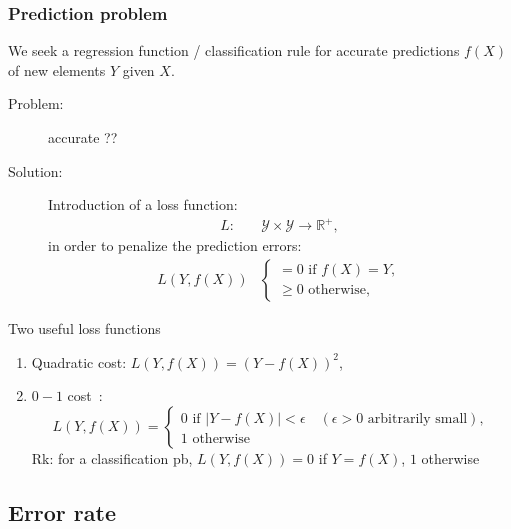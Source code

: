 \documentclass[compress, smaller, serif, 9pt]{beamer}
\begin{document}
\begin{frame}
  \frametitle{Prediction problem}
  We seek a regression function / classification rule for  \alert{accurate} predictions $f(X)$ 
  of new elements $Y$ given $X$.
  \begin{description}
   \item[Problem:] \alert{accurate ??}
   \item[Solution:] Introduction of a loss function:
   \begin{align*}
    L: \quad & \mathcal{Y} \times \mathcal{Y} \rightarrow \mathbb{R}^+,
   \end{align*}
   in order to penalize the prediction errors:
\begin{align*}
    L (Y, f(X) ) &
    \begin{cases}= 0 \textrm{ if } f(X)=Y,\\
     \ge 0 \textrm{ otherwise},
     \end{cases}
   \end{align*}
  \end{description}


  \begin{block}{Two useful loss functions}
  \begin{enumerate}
   \item Quadratic cost: $ L (Y, f(X) ) = \left( Y - f(X) \right)^2$,\\
   \item $0-1$ cost~: \vspace{-3mm} $$
 L (Y, f(X) ) = \begin{cases}
                                         0 \textrm{ if } | Y - f(X) | < \epsilon \quad ( \epsilon>0 \textrm{ arbitrarily small}),\\
                                         1 \textrm{ otherwise}
                                        \end{cases}$$
   Rk: for a classification pb,  $ L (Y, f(X) ) = 0$ if $Y = f(X)$, $1$ otherwise
  \end{enumerate}
\end{block}
\end{frame}

\subsection{Error rate}
\end{document}

